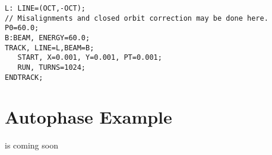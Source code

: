 \begin{verbatim}
L: LINE=(OCT,-OCT); 
// Misalignments and closed orbit correction may be done here. 
P0=60.0;
B:BEAM, ENERGY=60.0; 
TRACK, LINE=L,BEAM=B;
   START, X=0.001, Y=0.001, PT=0.001;
   RUN, TURNS=1024; 
ENDTRACK;
\end{verbatim}


\section{Autophase Example}
\label{sec:trackautoph}

is coming soon


